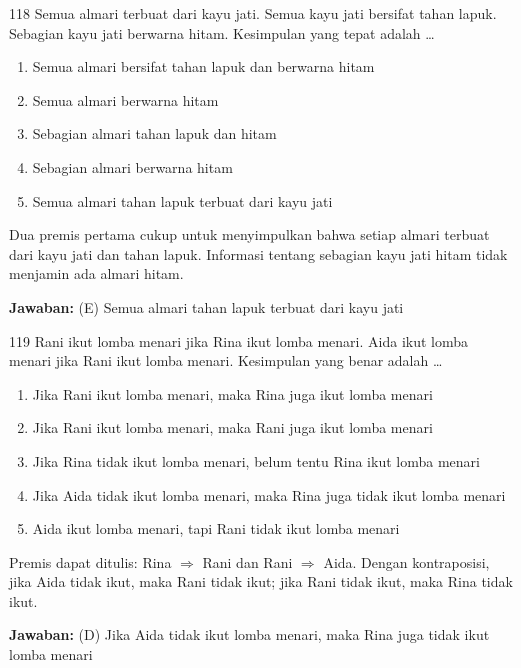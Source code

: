 \documentclass[11pt]{article}
\newenvironment{pil}{\begin{enumerate}[label=(\Alph*),leftmargin=*,itemsep=1pt,topsep=3pt]}{\end{enumerate}}
\newcommand{\jw}[1]{\par\smallskip\begin{jawbox}\textbf{Jawaban:} #1\end{jawbox}}
\begin{document}
\begin{soalbox}{1}{18}
Semua almari terbuat dari kayu jati. Semua kayu jati bersifat tahan lapuk. Sebagian kayu jati berwarna hitam. Kesimpulan yang tepat adalah \ldots
\begin{pil}\item Semua almari bersifat tahan lapuk dan berwarna hitam \item Semua almari berwarna hitam \item Sebagian almari tahan lapuk dan hitam \item Sebagian almari berwarna hitam \item Semua almari tahan lapuk terbuat dari kayu jati\end{pil}
\end{soalbox}
\begin{pembox}
Dua premis pertama cukup untuk menyimpulkan bahwa setiap almari terbuat dari kayu jati dan tahan lapuk. Informasi tentang sebagian kayu jati hitam tidak menjamin ada almari hitam.
\jw{(E) Semua almari tahan lapuk terbuat dari kayu jati}
\end{pembox}

\begin{soalbox}{1}{19}
Rani ikut lomba menari jika Rina ikut lomba menari. Aida ikut lomba menari jika Rani ikut lomba menari. Kesimpulan yang benar adalah \ldots
\begin{pil}\item Jika Rani ikut lomba menari, maka Rina juga ikut lomba menari \item Jika Rani ikut lomba menari, maka Rani juga ikut lomba menari \item Jika Rina tidak ikut lomba menari, belum tentu Rina ikut lomba menari \item Jika Aida tidak ikut lomba menari, maka Rina juga tidak ikut lomba menari \item Aida ikut lomba menari, tapi Rani tidak ikut lomba menari\end{pil}
\end{soalbox}
\begin{pembox}
Premis dapat ditulis: Rina $\Rightarrow$ Rani dan Rani $\Rightarrow$ Aida. Dengan kontraposisi, jika Aida tidak ikut, maka Rani tidak ikut; jika Rani tidak ikut, maka Rina tidak ikut.
\jw{(D) Jika Aida tidak ikut lomba menari, maka Rina juga tidak ikut lomba menari}
\end{pembox}
\end{document}
